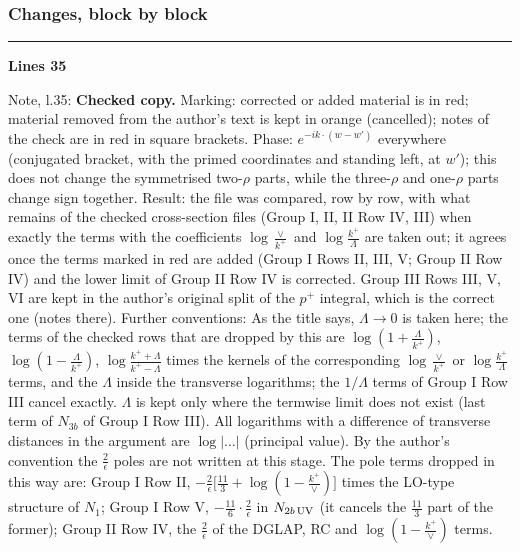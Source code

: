 \documentclass[10pt]{article}
\newenvironment{notebox}{\def\FrameCommand{{\color{notebar}\vrule width 1.5pt}\hspace{6pt}}\MakeFramed{\advance\hsize-\width\FrameRestore}\small}{\endMakeFramed}
\begin{document}
\subsubsection*{Changes, block by block}
\noindent\rule{\linewidth}{0.3pt}\par\noindent\textbf{Lines 35}\par
\begin{notebox}\textsf{\small Note, l.35:} \textbf{Checked copy.} Marking: corrected or added material is in red; material removed from the author's text is kept in orange (cancelled); notes of the check are in red in square brackets. Phase: $e^{-ik\cdot(w-w')}$ everywhere (conjugated bracket, with the primed coordinates and standing left, at $w'$); this does not change the symmetrised two-$\rho$ parts, while the three-$\rho$ and one-$\rho$ parts change sign together. Result: the file was compared, row by row, with what remains of the checked cross-section files (Group I, II, II Row IV, III) when exactly the terms with the coefficients $\log\frac{\vee}{k^{+}}$ and $\log\frac{k^{+}}{\Lambda}$ are taken out; it agrees once the terms marked in red are added (Group I Rows II, III, V; Group II Row IV) and the lower limit of Group II Row IV is corrected. Group III Rows III, V, VI are kept in the author's original split of the $p^{+}$ integral, which is the correct one (notes there). Further conventions: As the title says, $\Lambda\to0$ is taken here; the terms of the checked rows that are dropped by this are $\log(1+\frac{\Lambda}{k^{+}})$, $\log(1-\frac{\Lambda}{k^{+}})$, $\log\frac{k^{+}+\Lambda}{k^{+}-\Lambda}$ times the kernels of the corresponding $\log\frac{\vee}{k^{+}}$ or $\log\frac{k^{+}}{\Lambda}$ terms, and the $\Lambda$ inside the transverse logarithms; the $1/\Lambda$ terms of Group I Row III cancel exactly. $\Lambda$ is kept only where the termwise limit does not exist (last term of $N_{3b}$ of Group I Row III). All logarithms with a difference of transverse distances in the argument are $\log|\dots|$ (principal value). By the author's convention the $\frac{2}{\epsilon}$ poles are not written at this stage. The pole terms dropped in this way are: Group I Row II, $-\frac{2}{\epsilon}\big[\frac{11}{3}+\log(1-\frac{k^{+}}{\vee})\big]$ times the LO-type structure of $N_{1}$; Group I Row V, $-\frac{11}{6}\cdot\frac{2}{\epsilon}$ in $N_{2b\,\rm UV}$ (it cancels the $\frac{11}{3}$ part of the former); Group II Row IV, the $\frac{2}{\epsilon}$ of the DGLAP, RC and $\log(1-\frac{k^{+}}{\vee})$ terms.\end{notebox}
\end{document}
